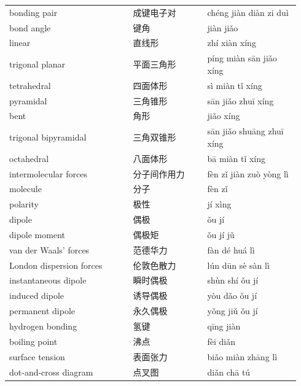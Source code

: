 \documentclass[11pt]{article}
\begin{document}
\begin{longtable}{@{}p{0.40\linewidth}p{0.24\linewidth}p{0.30\linewidth}@{}}
bonding pair & 成键电子对 & chéng jiàn diàn zi duì \\
bond angle & 键角 & jiàn jiǎo \\
linear & 直线形 & zhí xiàn xíng \\
trigonal planar & 平面三角形 & píng miàn sān jiǎo xíng \\
tetrahedral & 四面体形 & sì miàn tǐ xíng \\
pyramidal & 三角锥形 & sān jiǎo zhuī xíng \\
bent & 角形 & jiǎo xíng \\
trigonal bipyramidal & 三角双锥形 & sān jiǎo shuāng zhuī xíng \\
octahedral & 八面体形 & bā miàn tǐ xíng \\
intermolecular forces & 分子间作用力 & fèn zǐ jiàn zuò yòng lì \\
molecule & 分子 & fèn zǐ \\
polarity & 极性 & jí xìng \\
dipole & 偶极 & ǒu jí \\
dipole moment & 偶极矩 & ǒu jí jǔ \\
van der Waals' forces & 范德华力 & fàn dé huá lì \\
London dispersion forces & 伦敦色散力 & lún dūn sè sàn lì \\
instantaneous dipole & 瞬时偶极 & shùn shí ǒu jí \\
induced dipole & 诱导偶极 & yòu dǎo ǒu jí \\
permanent dipole & 永久偶极 & yǒng jiǔ ǒu jí \\
hydrogen bonding & 氢键 & qīng jiàn \\
boiling point & 沸点 & fèi diǎn \\
surface tension & 表面张力 & biǎo miàn zhāng lì \\
dot-and-cross diagram & 点叉图 & diǎn chā tú \\
\end{longtable}
\end{document}
